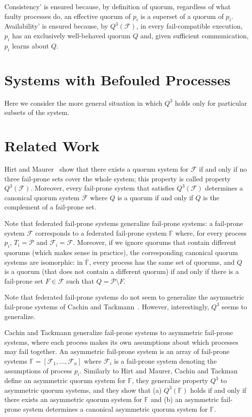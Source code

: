 \documentclass[11pt,letterpaper]{article}
\newcommand{\note}[1]{{\color{red}#1}}
\begin{document}
Consistency' is ensured because, by definition of quorum, regardless of what faulty processes do, an effective quorum of $p_i$ is a superset of a quorum of $p_i$.
Availability' is ensured because, by $Q^3(\mathcal{F})$, in every fail-compatible execution, $p_i$ has an exclusively well-behaved quorum $Q$ and, given sufficient communication, $p_i$ learns about $Q$.

\section{Systems with Befouled Processes}

Here we consider the more general situation in which $Q^3$ holds only for particular subsets of the system.

\section{Related Work}

Hirt and Maurer~\cite{hirtPlayerSimulationGeneral2000} show that there exists a quorum system for $\mathcal{F}$ if and only if no three fail-prone sets cover the whole system; this property is called property $Q^3(\mathcal{F})$. Moreover, every fail-prone system that satisfies $Q^3(\mathcal{F})$ determines a canonical quorum system $\overline{\mathcal{F}}$ where $Q$ is a quorum if and only if $Q$ is the complement of a fail-prone set. %

Note that federated fail-prone systems generalize fail-prone systems: a fail-prone system $\mathcal{F}$ corresponds to a federated fail-prone system $\mathbb{F}$ where, for every process $p_i$, $T_i=\mathcal{P}$ and $\mathcal{F}_i=\mathcal{F}$.
Moreover, if we ignore quorums that contain different quorums (which makes sense in practice), the corresponding canonical quorum systems are isomorphic: in $\overline{\mathbb{F}}$, every process has the same set of quorums, and $Q$ is a quorum (that does not contain a different quorum) if and only if there is a fail-prone set $F\in\mathcal{F}$ such that $Q=\mathcal{P}\setminus F$.

\note{Note that federated fail-prone systems do not seem to generalize the asymmetric fail-prone systems of Cachin and Tackmann~\cite{cachinAsymmetricDistributedTrust2019}. However, interestingly, $Q^3$ seems to generalize.}

Cachin and Tackmann generalize fail-prone systems to asymmetric fail-prone systems, where each process makes its own assumptions about which processes may fail together.
An asymmetric fail-prone system is an array of fail-prone systems $\mathbb{F}=\left[\mathcal{F}_1,...,\mathcal{F}_n\right]$ where $\mathcal{F}_i$ is a fail-prone system denoting the assumptions of process $p_i$.  Similarly to Hirt and Maurer, Cachin and Tackman define an asymmetric quorum system for $\mathbb{F}$, they generalize property $Q^3$ to asymmetric quorum systems, and they show that (a) $Q^3(\mathbb{F})$ holds if and only if there exists an asymmetric quorum system for $\mathbb{F}$ and (b) an asymmetric fail-prone system determines a canonical asymmetric quorum system for $\mathbb{F}$.
\end{document}
